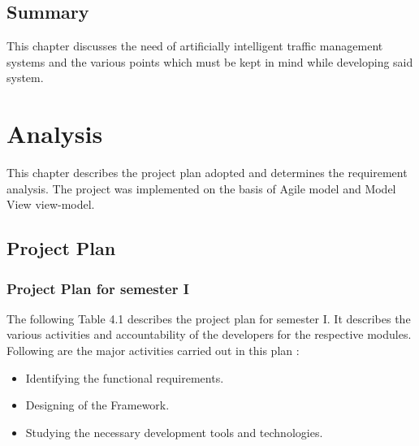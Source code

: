 \documentclass[openany,12pt]{report}
\begin{document}
	
	
	\section{Summary}
	\hspace*{0.5in}This chapter discusses the need of artificially intelligent traffic management systems and the various points which must be kept in mind while developing said system.\\
	
	
	\chapter{Analysis}

	
	\hspace*{0.5 in}This chapter describes the project plan adopted and determines the requirement analysis. The project was implemented on the basis of Agile model and Model View view-model.
	
	
	\section{Project Plan}
	
	\subsection{Project Plan for semester I}
	
	\hspace*{0.5 in}The following Table 4.1 describes the project plan for semester I. It describes the various activities and accountability of the developers for the respective modules. Following are the major activities carried out in this plan :
	\begin{itemize}
		\item{Identifying the functional requirements.}
		\item{Designing of the Framework.}
		\item{Studying the necessary development tools and technologies.}
	\end{itemize}
	
\end{document}
